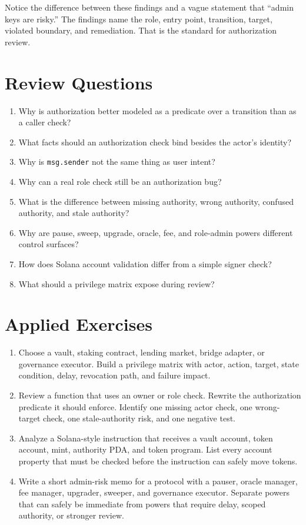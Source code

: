 Notice the difference between these findings and a vague statement that ``admin keys are risky.'' The findings name the role, entry point, transition, target, violated boundary, and remediation. That is the standard for authorization review.

\section*{Review Questions}

\begin{enumerate}
\item Why is authorization better modeled as a predicate over a transition than as a caller check?
\item What facts should an authorization check bind besides the actor's identity?
\item Why is \texttt{msg.sender} not the same thing as user intent?
\item Why can a real role check still be an authorization bug?
\item What is the difference between missing authority, wrong authority, confused authority, and stale authority?
\item Why are pause, sweep, upgrade, oracle, fee, and role-admin powers different control surfaces?
\item How does Solana account validation differ from a simple signer check?
\item What should a privilege matrix expose during review?
\end{enumerate}

\section*{Applied Exercises}

\begin{enumerate}
\item Choose a vault, staking contract, lending market, bridge adapter, or governance executor. Build a privilege matrix with actor, action, target, state condition, delay, revocation path, and failure impact.

\item Review a function that uses an owner or role check. Rewrite the authorization predicate it should enforce. Identify one missing actor check, one wrong-target check, one stale-authority risk, and one negative test.

\item Analyze a Solana-style instruction that receives a vault account, token account, mint, authority PDA, and token program. List every account property that must be checked before the instruction can safely move tokens.

\item Write a short admin-risk memo for a protocol with a pauser, oracle manager, fee manager, upgrader, sweeper, and governance executor. Separate powers that can safely be immediate from powers that require delay, scoped authority, or stronger review.
\end{enumerate}
